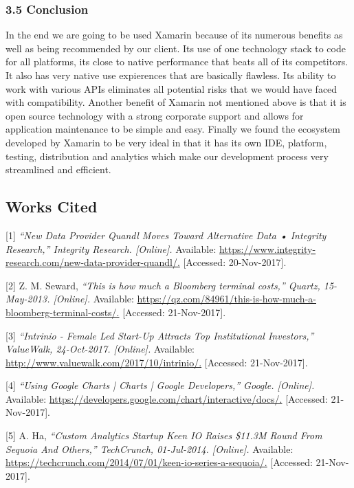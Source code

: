 \documentclass[onecolumn, draftclsnofoot,10pt, compsoc]{IEEEtran}
\begin{document}
\subsubsection{3.5 Conclusion}
In the end we are going to be used Xamarin because of its numerous benefits as well as being recommended by our client. Its use of one technology stack to code for all platforms, its close to native performance that beats all of its competitors. It also has very native use expierences that are basically flawless. Its ability to work with various APIs eliminates all potential risks that we would have faced with compatibility. Another benefit of Xamarin not mentioned above is that it is open source technology with a strong corporate support and allows for application maintenance to be simple and easy. Finally we found the ecosystem developed by Xamarin to be very ideal in that it has its own IDE, platform, testing, distribution and analytics which make our development process very streamlined and efficient. 




	
\subsection{Works Cited}

[1] \textit{“New Data Provider Quandl Moves Toward Alternative Data • Integrity Research,” Integrity Research. [Online].} Available: \url{https://www.integrity-research.com/new-data-provider-quandl/.} [Accessed: 20-Nov-2017].

[2] Z. M. Seward, \textit{“This is how much a Bloomberg terminal costs,” Quartz, 15-May-2013. [Online].} Available: \url{https://qz.com/84961/this-is-how-much-a-bloomberg-terminal-costs/.} [Accessed: 21-Nov-2017].

[3] \textit{“Intrinio - Female Led Start-Up Attracts Top Institutional Investors,” ValueWalk, 24-Oct-2017. [Online].} Available: \url{http://www.valuewalk.com/2017/10/intrinio/.} [Accessed: 21-Nov-2017].

[4] \textit{“Using Google Charts  |  Charts  |  Google Developers,” Google. [Online].} Available: \url{https://developers.google.com/chart/interactive/docs/.} [Accessed: 21-Nov-2017].

[5] A. Ha, \textit{“Custom Analytics Startup Keen IO Raises \$11.3M Round From Sequoia And Others,” TechCrunch, 01-Jul-2014. [Online].} Available: \url{https://techcrunch.com/2014/07/01/keen-io-series-a-sequoia/.} [Accessed: 21-Nov-2017].
\end{document}
